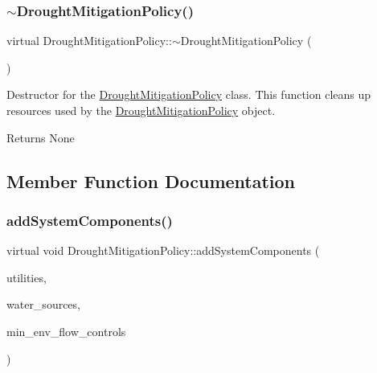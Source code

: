 \subsubsection{\texorpdfstring{$\sim$\+Drought\+Mitigation\+Policy()}{~DroughtMitigationPolicy()}}
{\footnotesize\ttfamily virtual Drought\+Mitigation\+Policy\+::$\sim$\+Drought\+Mitigation\+Policy (\begin{DoxyParamCaption}{ }\end{DoxyParamCaption})\hspace{0.3cm}{\ttfamily [virtual]}}



Destructor for the \mbox{\hyperlink{classDroughtMitigationPolicy}{Drought\+Mitigation\+Policy}} class. This function cleans up resources used by the \mbox{\hyperlink{classDroughtMitigationPolicy}{Drought\+Mitigation\+Policy}} object. 

\begin{DoxyReturn}{Returns}
None 
\end{DoxyReturn}


\subsection{Member Function Documentation}
\mbox{\label{classDroughtMitigationPolicy_aaab042a79d781afe8e08753b7012372a}} 
\subsubsection{\texorpdfstring{add\+System\+Components()}{addSystemComponents()}}
{\footnotesize\ttfamily virtual void Drought\+Mitigation\+Policy\+::add\+System\+Components (\begin{DoxyParamCaption}\item[{vector$<$ \mbox{\hyperlink{classUtility}{Utility}} $\ast$$>$}]{utilities,  }\item[{vector$<$ \mbox{\hyperlink{classWaterSource}{Water\+Source}} $\ast$$>$}]{water\+\_\+sources,  }\item[{vector$<$ \mbox{\hyperlink{classMinEnvFlowControl}{Min\+Env\+Flow\+Control}} $\ast$$>$}]{min\+\_\+env\+\_\+flow\+\_\+controls }\end{DoxyParamCaption})\hspace{0.3cm}{\ttfamily [pure virtual]}}



